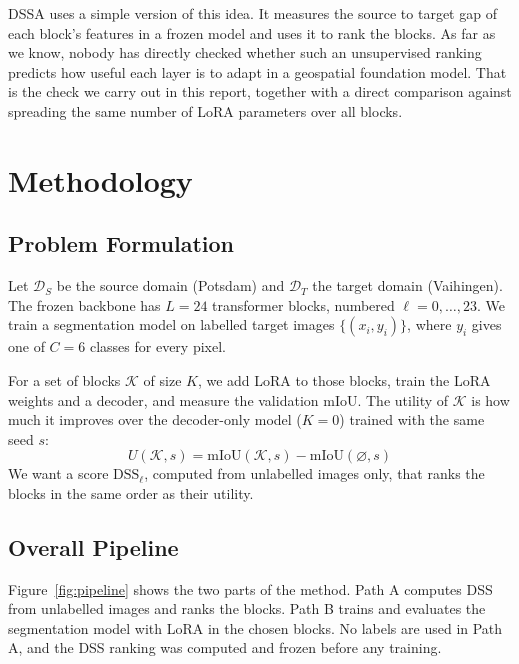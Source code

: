 \documentclass[11pt,a4paper]{report}
\begin{document}
DSSA uses a simple version of this idea. It measures the source to target gap of each block's features in a frozen model and uses it to rank the blocks. As far as we know, nobody has directly checked whether such an unsupervised ranking predicts how useful each layer is to adapt in a geospatial foundation model. That is the check we carry out in this report, together with a direct comparison against spreading the same number of LoRA parameters over all blocks.

\chapter{Methodology}
\label{ch:method}

\section{Problem Formulation}

Let $\mathcal{D}_S$ be the source domain (Potsdam) and $\mathcal{D}_T$ the target domain (Vaihingen). The frozen backbone has $L = 24$ transformer blocks, numbered $\ell = 0, \dots, 23$. We train a segmentation model on labelled target images $\{(x_i, y_i)\}$, where $y_i$ gives one of $C = 6$ classes for every pixel.

For a set of blocks $\mathcal{K}$ of size $K$, we add LoRA to those blocks, train the LoRA weights and a decoder, and measure the validation mIoU. The utility of $\mathcal{K}$ is how much it improves over the decoder-only model ($K = 0$) trained with the same seed $s$:
\begin{equation}
    U(\mathcal{K}, s) = \text{mIoU}(\mathcal{K}, s) - \text{mIoU}(\varnothing, s)
\end{equation}
We want a score $\text{DSS}_\ell$, computed from unlabelled images only, that ranks the blocks in the same order as their utility.

\section{Overall Pipeline}

Figure~\ref{fig:pipeline} shows the two parts of the method. Path A computes DSS from unlabelled images and ranks the blocks. Path B trains and evaluates the segmentation model with LoRA in the chosen blocks. No labels are used in Path A, and the DSS ranking was computed and frozen before any training.
\end{document}
